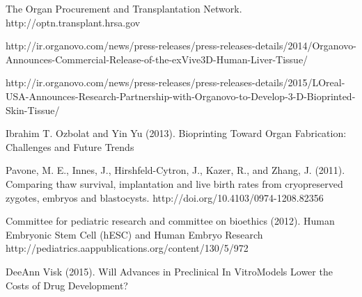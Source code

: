 \documentclass[12pt]{article} %
\begin{document}
\begin{thebibliography}{99}
\begin{small}
\newblock The Organ Procurement and Transplantation Network.
\newblock http://optn.transplant.hrsa.gov

\newblock http://ir.organovo.com/news/press-releases/press-releases-details/2014/Organovo-Announces-Commercial-Release-of-the-exVive3D-Human-Liver-Tissue/

\newblock http://ir.organovo.com/news/press-releases/press-releases-details/2015/LOreal-USA-Announces-Research-Partnership-with-Organovo-to-Develop-3-D-Bioprinted-Skin-Tissue/

\newblock Ibrahim T. Ozbolat and Yin Yu (2013).
\newline Bioprinting Toward Organ Fabrication: Challenges and Future Trends

\newblock Pavone, M. E., Innes, J., Hirshfeld-Cytron, J., Kazer, R., and Zhang, J. (2011).
\newline Comparing thaw survival, implantation and live birth rates from cryopreserved zygotes, embryos and blastocysts. 
\newblock http://doi.org/10.4103/0974-1208.82356

\newblock Committee for pediatric research and committee on bioethics  (2012).
\newline Human Embryonic Stem Cell (hESC) and Human Embryo Research
\newblock http://pediatrics.aappublications.org/content/130/5/972

\newblock DeeAnn Visk (2015).
\newline Will Advances in Preclinical In VitroModels Lower the Costs of Drug Development?


\end{small}
\end{thebibliography}
\end{document}
